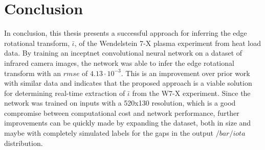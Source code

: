 %
\chapter{Conclusion}
\label{sec:conclusion}

In conclusion, this thesis presents a successful approach for inferring the edge rotational transform, $\bar{\iota}$, of the Wendelstein 7-X plasma experiment from heat load data. By training an inceptnet convolutional neural network on a dataset of infrared camera images, the network was able to infer the edge rotational transform with an $rmse$ of $4.13 \cdot 10^{-3}$. This is an improvement over prior work with similar data and indicates that the proposed approach is a viable solution for determining real-time extraction of $\bar{\iota}$ from the W7-X experiment. Since the network was trained on inputs with a 520x130 resolution, which is a good compromise between computational cost and network performance, further improvements can be quickly made by expanding the dataset, both in size and maybe with completely simulated labels for the gaps in the output $/bar{/iota}$ distribution.